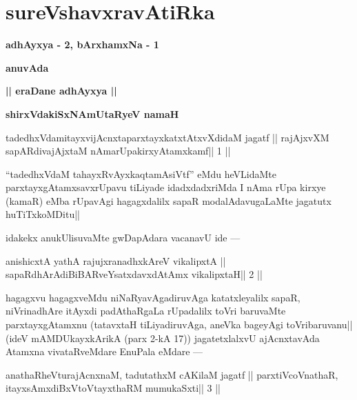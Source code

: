 \chapter{sureVshavxravAtiRka}

\begin{center}
{\Large\textbf{adhAyxya - 2, bArxhamxNa - 1}}
\medskip

{\large\textbf{anuvAda}}
\medskip

{\large\textbf{|| eraDane adhAyxya ||}}
\end{center}

\begin{center}
\centerline{\bf shirxVdakiSxNAmUtaRyeV namaH}
\medskip
\end{center}


\begin{shl}
tadedhxVdamitayxvijAcnxtaparxtayxkatxtAtxvXdidaM jagatf ||
rajAjxvXM sapARdivajAjxtaM nAmarUpakirxyAtamxkamf\hfill || 1 ||
\end{shl}

\begin{artha}
``tadedhxVdaM tahayxRvAyxkaqtamAsiVtf'' eMdu heVLidaMte parxtayxgAtamxsavxrUpavu tiLiyade idadxdadxriMda I nAma rUpa kirxye (kamaR) eMba rUpavAgi hagagxdalilx sapaR modalAdavugaLaMte jagatutx huTiTxkoMDitu||
\end{artha} 
 
\begin{artha}
idakekx anukUlisuvaMte gwDapAdara vacanavU ide ---
\end{artha} 

\begin{shl}
anishicxtA yathA rajujxranadhxkAreV vikalipxtA ||
sapaRdhArAdiBiBARveYsatxdavxdAtAmx vikalipxtaH\hfill || 2 ||
\end{shl}

\begin{artha}
hagagxvu hagagxveMdu niNaRyavAgadiruvAga katatxleyalilx sapaR, 
niVrinadhAre itAyxdi padAthaRgaLa rUpadalilx toVri baruvaMte 
parxtayxgAtamxnu (tatavxtaH tiLiyadiruvAga, aneVka bageyAgi 
toVribaruvanu|| (ideV mAMDUkayxkArikA (parx 2-kA 17)) jagatetxlalxvU ajAcnxtavAda Atamxna vivataRveMdare EnuPala  eMdare ---
\end{artha}

\begin{shl}
anathaRheVturajAcnxnaM, tadutathxM cAKilaM jagatf ||
parxtiVcoV\s nathaR, itayxsAmxdiBxVtoV\s tayxthaRM mumukaSxti\hfill || 3 ||
\end{shl}

